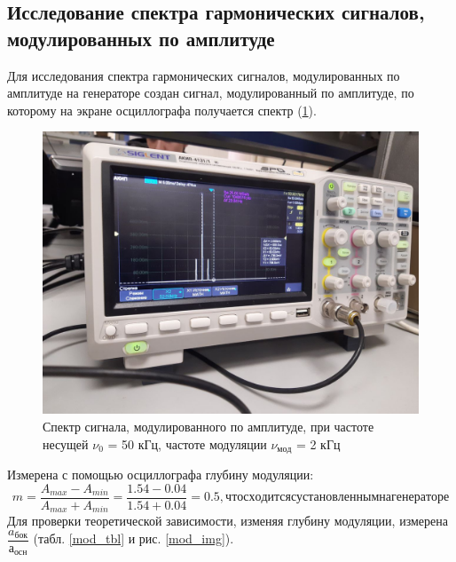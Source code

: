 \documentclass[a4paper,12pt]{article} %
\begin{document}
\subsection{Исследование спектра гармонических сигналов, модулированных по амплитуде}
Для исследования спектра гармонических сигналов, модулированных по амплитуде на генераторе создан сигнал, модулированный по амплитуде, по которому на экране осциллографа получается спектр (\ref{мод}).
\begin{figure}[h!]
\begin{center}
\includegraphics[width=\textwidth]{3}
\caption{Спектр сигнала, модулированного по амплитуде, при частоте несущей $\nu_0$ = 50 кГц, частоте модуляции $\nu_{мод}$ = 2 кГц} \label{мод}
\end{center}
\end{figure}
Измерена с помощью осциллографа глубину модуляции:
\begin{equation}
m = \dfrac{A_{max}-A_{min}}{A_{max}+A_{min}} = \dfrac{1.54 - 0.04}{1.54 + 0.04} = 0.5, что сходится с установленным на генераторе
\end{equation}
Для проверки теоретической зависимости, изменяя глубину модуляции, измерена $\dfrac{a_{бок}}{а_{осн}}$ (табл. \ref{mod_tbl} и рис. \ref{mod_img}).
\end{document}
